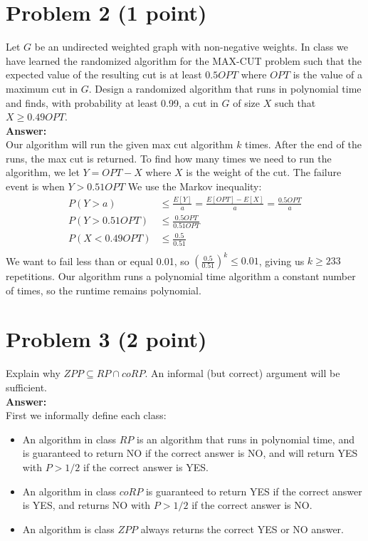 \documentclass[letterpaper, 11pt]{article}
\begin{document}
\section*{Problem 2 (1 point)}
Let $G$ be an undirected weighted graph with non-negative weights. In class we have learned the randomized algorithm for the MAX-CUT problem such that the expected value of the resulting cut is at least $0.5OPT$ where $OPT$ is the value of a maximum cut in $G$. Design a randomized algorithm that runs in polynomial time and finds, with probability at least 0.99, a cut in $G$ of size $X$ such that $X \geq 0.49OPT$.\\
\textbf{Answer:} \\
Our algorithm will run the given max cut algorithm $k$ times. After the end of the runs, the max cut is returned. To find how many times we need to run the algorithm, we let $Y=OPT-X$ where $X$ is the weight of the cut. The failure event is when $Y > 0.51OPT$ We use the Markov inequality:
\begin{align*}
P(Y > a) &\leq \frac{E[Y]}{a} = \frac{E[OPT]-E[X]}{a} = \frac{0.5OPT}{a} \\
P(Y > 0.51OPT) &\leq \frac{0.5OPT}{0.51OPT} \\
P(X < 0.49OPT) &\leq \frac{0.5}{0.51} \\
\end{align*}
We want to fail less than or equal 0.01, so $\left(\frac{0.5}{0.51}\right)^k \leq 0.01$, giving us $k \geq 233$ repetitions. Our algorithm runs a polynomial time algorithm a constant number of times, so the runtime remains polynomial.

\pagebreak
\section*{Problem 3 (2 point)}
Explain why $ZPP \subseteq RP \cap coRP$. An informal (but correct) argument will be sufficient. \\
\textbf{Answer:} \\
First we informally define each class:
\begin{itemize}
\item An algorithm in class $RP$ is an algorithm that runs in polynomial time, and is guaranteed to return NO if the correct answer is NO, and will return YES with $P > 1/2$ if the correct answer is YES.
\item An algorithm in class $coRP$ is guaranteed to return YES if the correct answer is YES, and returns NO with $P > 1/2$ if the correct answer is NO.
\item An algorithm is class $ZPP$ always returns the correct YES or NO answer.
\end{itemize}
\end{document}
